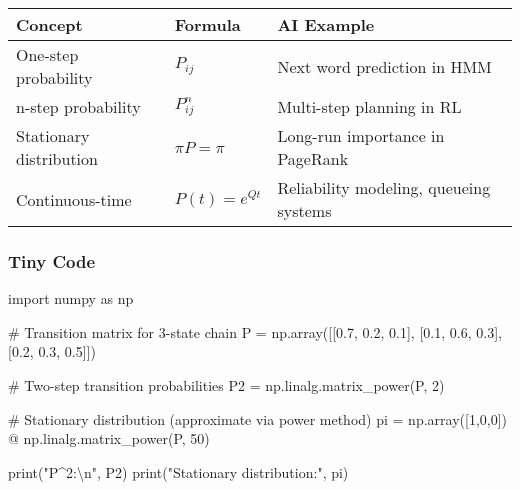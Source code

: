 \documentclass[
  letterpaper,
  DIV=11,
  numbers=noendperiod]{scrreprt}
\newenvironment{Shaded}{\begin{snugshade}}{\end{snugshade}}
\newcommand{\BuiltInTok}[1]{\textcolor[rgb]{0.00,0.23,0.31}{#1}}
\newcommand{\CharTok}[1]{\textcolor[rgb]{0.13,0.47,0.30}{#1}}
\newcommand{\CommentTok}[1]{\textcolor[rgb]{0.37,0.37,0.37}{#1}}
\newcommand{\DecValTok}[1]{\textcolor[rgb]{0.68,0.00,0.00}{#1}}
\newcommand{\FloatTok}[1]{\textcolor[rgb]{0.68,0.00,0.00}{#1}}
\newcommand{\ImportTok}[1]{\textcolor[rgb]{0.00,0.46,0.62}{#1}}
\newcommand{\NormalTok}[1]{\textcolor[rgb]{0.00,0.23,0.31}{#1}}
\newcommand{\OperatorTok}[1]{\textcolor[rgb]{0.37,0.37,0.37}{#1}}
\newcommand{\StringTok}[1]{\textcolor[rgb]{0.13,0.47,0.30}{#1}}
\begin{document}
\begin{longtable}[]{@{}
  >{\raggedright\arraybackslash}p{}
  >{\raggedright\arraybackslash}p{}
  >{\raggedright\arraybackslash}p{}@{}}
\toprule\noalign{}
\begin{minipage}[b]{\linewidth}\raggedright
Concept
\end{minipage} & \begin{minipage}[b]{\linewidth}\raggedright
Formula
\end{minipage} & \begin{minipage}[b]{\linewidth}\raggedright
AI Example
\end{minipage} \\
\midrule\noalign{}
\endhead
\bottomrule\noalign{}
\endlastfoot
One-step probability & \(P_{ij}\) & Next word prediction in HMM \\
n-step probability & \(P^n_{ij}\) & Multi-step planning in RL \\
Stationary distribution & \(\pi P = \pi\) & Long-run importance in
PageRank \\
Continuous-time & \(P(t)=e^{Qt}\) & Reliability modeling, queueing
systems \\
\end{longtable}

\subsubsection{Tiny Code}\label{tiny-code-175}

\begin{Shaded}
\begin{Highlighting}[]
\ImportTok{import}\NormalTok{ numpy }\ImportTok{as}\NormalTok{ np}

\CommentTok{\# Transition matrix for 3{-}state chain}
\NormalTok{P }\OperatorTok{=}\NormalTok{ np.array([[}\FloatTok{0.7}\NormalTok{, }\FloatTok{0.2}\NormalTok{, }\FloatTok{0.1}\NormalTok{],}
\NormalTok{              [}\FloatTok{0.1}\NormalTok{, }\FloatTok{0.6}\NormalTok{, }\FloatTok{0.3}\NormalTok{],}
\NormalTok{              [}\FloatTok{0.2}\NormalTok{, }\FloatTok{0.3}\NormalTok{, }\FloatTok{0.5}\NormalTok{]])}

\CommentTok{\# Two{-}step transition probabilities}
\NormalTok{P2 }\OperatorTok{=}\NormalTok{ np.linalg.matrix\_power(P, }\DecValTok{2}\NormalTok{)}

\CommentTok{\# Stationary distribution (approximate via power method)}
\NormalTok{pi }\OperatorTok{=}\NormalTok{ np.array([}\DecValTok{1}\NormalTok{,}\DecValTok{0}\NormalTok{,}\DecValTok{0}\NormalTok{]) }\OperatorTok{@}\NormalTok{ np.linalg.matrix\_power(P, }\DecValTok{50}\NormalTok{)}

\BuiltInTok{print}\NormalTok{(}\StringTok{"P\^{}2:}\CharTok{\textbackslash{}n}\StringTok{"}\NormalTok{, P2)}
\BuiltInTok{print}\NormalTok{(}\StringTok{"Stationary distribution:"}\NormalTok{, pi)}
\end{Highlighting}
\end{Shaded}
\end{document}
